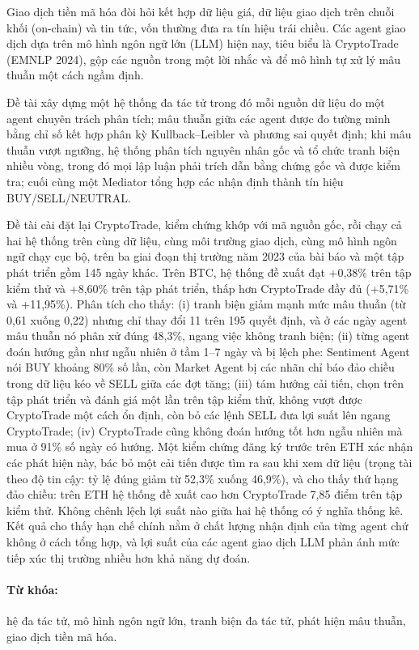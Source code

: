Giao dịch tiền mã hóa đòi hỏi kết hợp dữ liệu giá, dữ liệu giao dịch trên chuỗi khối (on-chain) và tin tức, vốn
thường đưa ra tín hiệu trái chiều. Các agent giao dịch dựa trên mô hình ngôn ngữ lớn (LLM) hiện nay, tiêu biểu là
CryptoTrade (EMNLP 2024), gộp các nguồn trong một lời nhắc và để mô hình tự xử lý mâu thuẫn một cách ngầm định.

Đề tài xây dựng một hệ thống đa tác tử trong đó mỗi nguồn dữ liệu do một agent chuyên trách phân tích; mâu thuẫn giữa
các agent được đo tường minh bằng chỉ số kết hợp phân kỳ Kullback--Leibler và phương sai quyết định; khi mâu thuẫn vượt
ngưỡng, hệ thống phân tích nguyên nhân gốc và tổ chức tranh biện nhiều vòng, trong đó mọi lập luận phải trích dẫn
bằng chứng gốc và được kiểm tra; cuối cùng một Mediator tổng hợp các nhận định thành tín hiệu BUY/SELL/NEUTRAL.

Đề tài cài đặt lại CryptoTrade, kiểm chứng khớp với mã nguồn gốc, rồi chạy cả hai hệ thống trên cùng dữ liệu, cùng môi
trường giao dịch, cùng mô hình ngôn ngữ chạy cục bộ, trên ba giai đoạn thị trường năm 2023 của bài báo và một tập phát
triển gồm 145 ngày khác. Trên BTC, hệ thống đề xuất đạt +0,38\% trên tập kiểm thử và +8,60\% trên tập phát triển, thấp
hơn CryptoTrade đầy đủ (+5,71\% và +11,95\%). Phân tích cho thấy: (i) tranh biện giảm mạnh mức mâu thuẫn (từ 0,61 xuống
0,22) nhưng chỉ thay đổi 11 trên 195 quyết định, và ở các ngày agent mâu thuẫn nó phân xử đúng 48,3\%, ngang việc không
tranh biện; (ii) từng agent đoán hướng gần như ngẫu nhiên ở tầm 1--7 ngày và bị lệch phe: Sentiment Agent nói BUY khoảng
80\% số lần, còn Market Agent bị các nhãn chỉ báo đảo chiều trong dữ liệu kéo về SELL giữa các đợt tăng; (iii) tám hướng
cải tiến, chọn trên tập phát triển và đánh giá một lần trên tập kiểm thử, không vượt được CryptoTrade một cách ổn định,
còn bỏ các lệnh SELL đưa lợi suất lên ngang CryptoTrade; (iv) CryptoTrade cũng không đoán hướng tốt hơn ngẫu nhiên mà
mua ở 91\% số ngày có hướng. Một kiểm chứng đăng ký trước trên ETH xác nhận các phát hiện này, bác bỏ một cải tiến được
tìm ra sau khi xem dữ liệu (trọng tài theo độ tin cậy: tỷ lệ đúng giảm từ 52,3\% xuống 46,9\%), và cho thấy thứ hạng
đảo chiều: trên ETH hệ thống đề xuất cao hơn CryptoTrade 7,85 điểm trên tập kiểm thử. Không chênh lệch lợi suất nào giữa
hai hệ thống có ý nghĩa thống kê. Kết quả cho thấy hạn chế chính nằm ở chất lượng nhận định của từng agent chứ không ở
cách tổng hợp, và lợi suất của các agent giao dịch LLM phản ánh mức tiếp xúc thị trường nhiều hơn khả năng dự đoán.

\paragraph{Từ khóa:} hệ đa tác tử, mô hình ngôn ngữ lớn, tranh biện đa tác tử, phát hiện mâu thuẫn, giao dịch tiền mã hóa.
